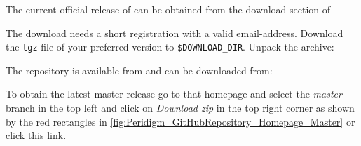 % 
%               
%          
% 


\label{sec:Install:Peridigm:Download}

The current official release of \marktool{\toolname} can be obtained from the download section of

\href{\tooladdress}{\tooladdress}

The download needs a short registration with a valid email-address. Download the \verb+tgz+ file of your preferred \marktool{\toolname} version to \verb+$DOWNLOAD_DIR+. Unpack the archive:

\begingroup
\lstset{breaklines=true}
\endgroup


The \marktool{\toolname} repository is available from \marktool{\githubname} and can be downloaded from:

\href{\toolrepoaddress}{\toolrepoaddress}

To obtain the latest master release go to that homepage and select the \textit{master} branch in the top left and click on \textit{Download zip} in the top right corner as shown by the red rectangles in \autoref{fig:Peridigm_GitHubRepository_Homepage_Master} or click this \href{\toolrepoaddresszip}{link}.


